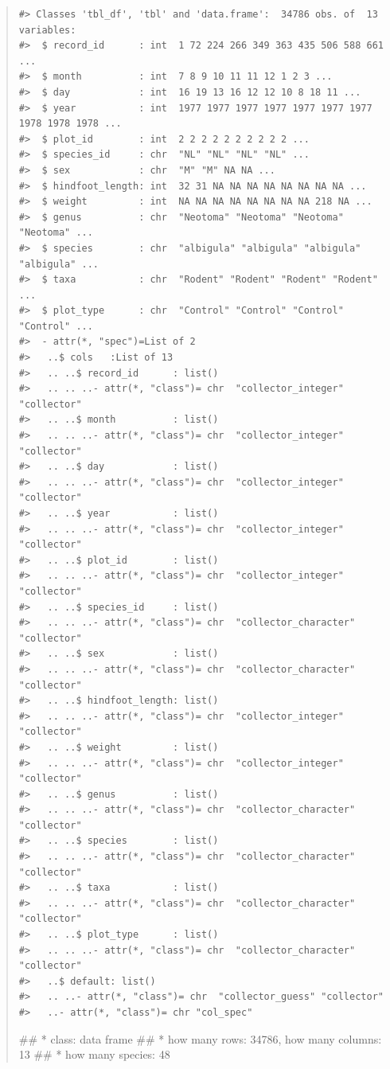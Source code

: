 \documentclass[]{book}
\newenvironment{Shaded}{\begin{snugshade}}{\end{snugshade}}
\newcommand{\NormalTok}[1]{#1}
\begin{document}
\begin{quote}
\begin{verbatim}
#> Classes 'tbl_df', 'tbl' and 'data.frame':  34786 obs. of  13 variables:
#>  $ record_id      : int  1 72 224 266 349 363 435 506 588 661 ...
#>  $ month          : int  7 8 9 10 11 11 12 1 2 3 ...
#>  $ day            : int  16 19 13 16 12 12 10 8 18 11 ...
#>  $ year           : int  1977 1977 1977 1977 1977 1977 1977 1978 1978 1978 ...
#>  $ plot_id        : int  2 2 2 2 2 2 2 2 2 2 ...
#>  $ species_id     : chr  "NL" "NL" "NL" "NL" ...
#>  $ sex            : chr  "M" "M" NA NA ...
#>  $ hindfoot_length: int  32 31 NA NA NA NA NA NA NA NA ...
#>  $ weight         : int  NA NA NA NA NA NA NA NA 218 NA ...
#>  $ genus          : chr  "Neotoma" "Neotoma" "Neotoma" "Neotoma" ...
#>  $ species        : chr  "albigula" "albigula" "albigula" "albigula" ...
#>  $ taxa           : chr  "Rodent" "Rodent" "Rodent" "Rodent" ...
#>  $ plot_type      : chr  "Control" "Control" "Control" "Control" ...
#>  - attr(*, "spec")=List of 2
#>   ..$ cols   :List of 13
#>   .. ..$ record_id      : list()
#>   .. .. ..- attr(*, "class")= chr  "collector_integer" "collector"
#>   .. ..$ month          : list()
#>   .. .. ..- attr(*, "class")= chr  "collector_integer" "collector"
#>   .. ..$ day            : list()
#>   .. .. ..- attr(*, "class")= chr  "collector_integer" "collector"
#>   .. ..$ year           : list()
#>   .. .. ..- attr(*, "class")= chr  "collector_integer" "collector"
#>   .. ..$ plot_id        : list()
#>   .. .. ..- attr(*, "class")= chr  "collector_integer" "collector"
#>   .. ..$ species_id     : list()
#>   .. .. ..- attr(*, "class")= chr  "collector_character" "collector"
#>   .. ..$ sex            : list()
#>   .. .. ..- attr(*, "class")= chr  "collector_character" "collector"
#>   .. ..$ hindfoot_length: list()
#>   .. .. ..- attr(*, "class")= chr  "collector_integer" "collector"
#>   .. ..$ weight         : list()
#>   .. .. ..- attr(*, "class")= chr  "collector_integer" "collector"
#>   .. ..$ genus          : list()
#>   .. .. ..- attr(*, "class")= chr  "collector_character" "collector"
#>   .. ..$ species        : list()
#>   .. .. ..- attr(*, "class")= chr  "collector_character" "collector"
#>   .. ..$ taxa           : list()
#>   .. .. ..- attr(*, "class")= chr  "collector_character" "collector"
#>   .. ..$ plot_type      : list()
#>   .. .. ..- attr(*, "class")= chr  "collector_character" "collector"
#>   ..$ default: list()
#>   .. ..- attr(*, "class")= chr  "collector_guess" "collector"
#>   ..- attr(*, "class")= chr "col_spec"
\end{verbatim}

\begin{Shaded}
\begin{Highlighting}[]
\NormalTok{## * class: data frame}
\NormalTok{## * how many rows: 34786,  how many columns: 13}
\NormalTok{## * how many species: 48}
\end{Highlighting}
\end{Shaded}
\end{quote}
\end{document}
